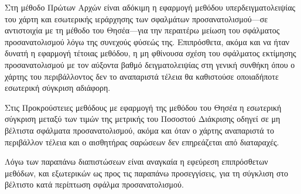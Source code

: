 \begin{remark}
  \label{remark:02_04_02:02}
  Στη μέθοδο Πρώτων Αρχών είναι αδόκιμη η εφαρμογή μεθόδου υπερδειγματολειψίας
  του χάρτη και εσωτερικής ιεράρχησης των σφαλμάτων προσανατολισμού---σε
  αντιστοιχία με τη μέθοδο του Θησέα---για την περαιτέρω μείωση του σφάλματος
  προσανατολισμού λόγω της συνεχούς φύσεώς της. Επιπρόσθετα, ακόμα και να ήταν
  δυνατή η εφαρμογή τέτοιας μεθόδου, η μη φθίνουσα σχέση του σφάλματος
  εκτίμησης προσανατολισμού με τον αύξοντα βαθμό δειγματολειψίας στη γενική
  συνθήκη όπου ο χάρτης του περιβάλλοντος δεν το αναπαριστά τέλεια θα
  καθιστούσε οποιαδήποτε εσωτερική σύγκριση αδιάφορη.
\end{remark}

\begin{remark}
  \label{remark:02_04_02:03}
  Στις Προκρούστειες μεθόδους με εφαρμογή της μεθόδου του Θησέα η εσωτερική
  σύγκριση μεταξύ των τιμών της μετρικής του Ποσοστού Διάκρισης οδηγεί σε μη
  βέλτιστα σφάλματα προσανατολισμού, ακόμα και όταν ο χάρτης αναπαριστά το
  περιβάλλον τέλεια και ο αισθητήρας σαρώσεων δεν επηρεάζεται από διαταραχές.
\end{remark}

Λόγω των παραπάνω διαπιστώσεων είναι αναγκαία η εφεύρεση επιπρόσθετων μεθόδων,
και εξωτερικών ως προς τις παραπάνω προσεγγίσεις, για τη σύγκλιση στο βέλτιστο
κατά περίπτωση σφάλμα προσανατολισμού.
